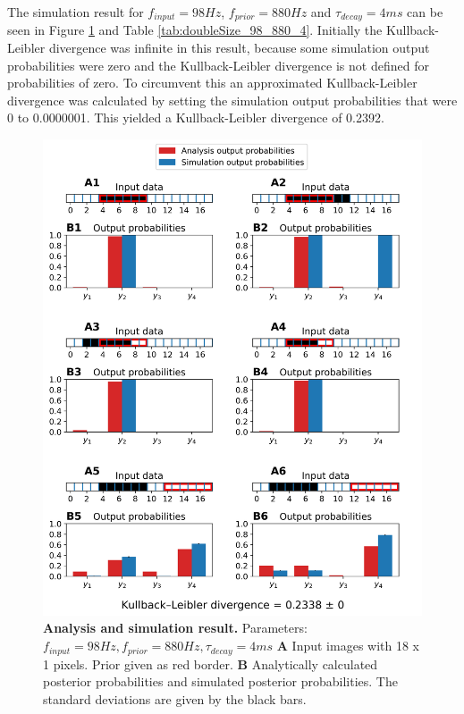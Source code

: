 The simulation result for $f_{input} = 98 Hz$, $f_{prior} = 880 Hz$ and $\tau_{decay} = 4 ms$ can be seen in Figure \ref{fig:doubleSize_98_880_4} and Table \ref{tab:doubleSize_98_880_4}. Initially the Kullback-Leibler divergence was infinite in this result, because some simulation output probabilities were zero and the Kullback-Leibler divergence is not defined for probabilities of zero. To circumvent this an approximated Kullback-Leibler divergence was calculated by setting the simulation output probabilities that were 0 to 0.0000001. This yielded a Kullback-Leibler divergence of 0.2392.
\begin{figure}
  \includegraphics[width=\linewidth]{figures/1D/doubleSize/doubleSize_98_880_4.png}
      \caption{\textbf{Analysis and simulation result. } Parameters: $f_{input} = 98 Hz, f_{prior} = 880 Hz, \tau_{decay} = 4 ms$ \textbf{A} Input images with 18 x 1 pixels. Prior given as red border. \textbf{B} Analytically calculated posterior probabilities and simulated posterior probabilities. The standard deviations are given by the black bars.}
  \label{fig:doubleSize_98_880_4}
\end{figure}

